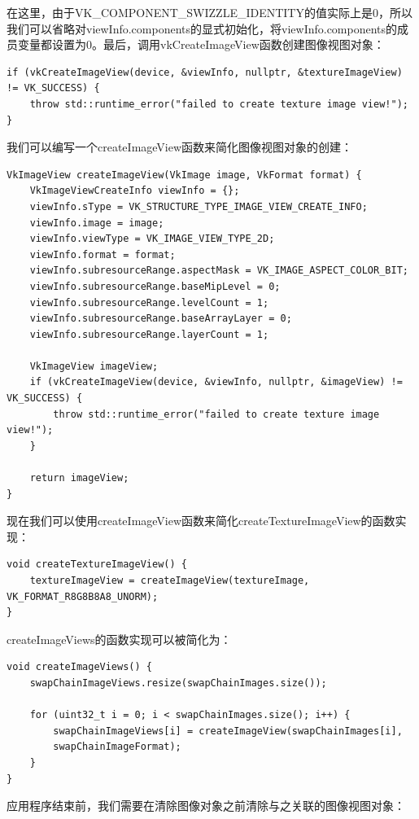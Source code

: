 \documentclass{ctexart}
\begin{document}
在这里，由于VK\_COMPONENT\_SWIZZLE\_IDENTITY的值实际上是0，所以我们可以省略对viewInfo.components的显式初始化，将viewInfo.components的成员变量都设置为0。最后，调用vkCreateImageView函数创建图像视图对象：

\begin{lstlisting}[language={[ANSI]C}]
if (vkCreateImageView(device, &viewInfo, nullptr, &textureImageView) != VK_SUCCESS) {
	throw std::runtime_error("failed to create texture image view!");
}
\end{lstlisting}

我们可以编写一个createImageView函数来简化图像视图对象的创建：

\begin{lstlisting}[language={[ANSI]C}]
VkImageView createImageView(VkImage image, VkFormat format) {
	VkImageViewCreateInfo viewInfo = {};
	viewInfo.sType = VK_STRUCTURE_TYPE_IMAGE_VIEW_CREATE_INFO;
	viewInfo.image = image;
	viewInfo.viewType = VK_IMAGE_VIEW_TYPE_2D;
	viewInfo.format = format;
	viewInfo.subresourceRange.aspectMask = VK_IMAGE_ASPECT_COLOR_BIT;
	viewInfo.subresourceRange.baseMipLevel = 0;
	viewInfo.subresourceRange.levelCount = 1;
	viewInfo.subresourceRange.baseArrayLayer = 0;
	viewInfo.subresourceRange.layerCount = 1;

	VkImageView imageView;
	if (vkCreateImageView(device, &viewInfo, nullptr, &imageView) != VK_SUCCESS) {
		throw std::runtime_error("failed to create texture image view!");
	}

	return imageView;
}
\end{lstlisting}

现在我们可以使用createImageView函数来简化createTextureImageView的函数实现：

\begin{lstlisting}[language={[ANSI]C}]
void createTextureImageView() {
	textureImageView = createImageView(textureImage, VK_FORMAT_R8G8B8A8_UNORM);
}
\end{lstlisting}

createImageViews的函数实现可以被简化为：

\begin{lstlisting}[language={[ANSI]C}]
void createImageViews() {
	swapChainImageViews.resize(swapChainImages.size());

	for (uint32_t i = 0; i < swapChainImages.size(); i++) {
		swapChainImageViews[i] = createImageView(swapChainImages[i],
		swapChainImageFormat);
	}
}
\end{lstlisting}

应用程序结束前，我们需要在清除图像对象之前清除与之关联的图像视图对象：
\end{document}
